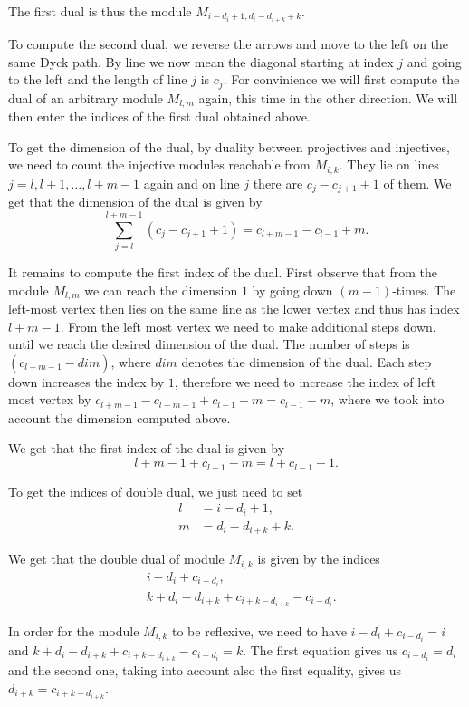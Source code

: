 \documentclass[12pt, a4paper]{article}
\numberwithin{equation}{section}
\theoremstyle{definition}
\theoremstyle{plain}
\theoremstyle{remark}
\begin{document}
The first dual is thus the module $M_{i - d_i + 1, d_i - d_{i+k} + k}$.

To compute the second dual, we reverse the arrows and move to the left on the same Dyck path. By line we now mean the diagonal starting at index $j$ and going to the left and the length of line $j$ is $c_j$.
For convinience we will first compute the dual of an arbitrary module $M_{l,m}$ again, this time in the other direction. We will then enter the indices of the first dual obtained above.

To get the dimension of the dual, by duality between projectives and injectives, we need to count the injective modules reachable from $M_{i,k}$.
They lie on lines $j = l, l+1, \dots, l+m-1$ again and on line $j$ there are $c_j - c_{j+1} + 1$ of them.
We get that the dimension of the dual is given by
\begin{equation}
\label{eq:injectives}      
\sum_{j=l}^{l+m-1} (c_j - c_{j+1} + 1) = c_{l+m-1} - c_{l-1} + m.
\end{equation}

It remains to compute the first index of the dual.
First observe that from the module $M_{l,m}$ we can reach the dimension $1$ by going down $(m - 1)$-times. The left-most vertex then lies on the same line as the lower vertex and thus has index $l + m - 1$.
From the left most vertex we need to make additional steps down, until we reach the desired dimension of the dual.
The number of steps is $(c_{l+m-1} - dim)$, where $dim$ denotes the dimension of the dual.
Each step down increases the index by $1$, therefore we need to increase the index of left most vertex by $c_{l+m-1} - c_{l+m-1} + c_{l-1} - m = c_{l-1} - m$, where we took into account the dimension computed above.

We get that the first index of the dual is given by 
$$l + m - 1 + c_{l-1} - m = l + c_{l-1} - 1.$$

To get the indices of double dual, we just need to set 
\begin{align*}
    l &= i - d_i + 1, \\
    m &= d_i - d_{i+k} + k.
\end{align*}

We get that the double dual of module $M_{i,k}$ is given by the indices
\begin{align*}
    &i - d_i + c_{i - d_i}, \\
    &k + d_i - d_{i+k} + c_{i+k-{d_{i+k}}} - c_{i-d_i}.
\end{align*}

In order for the module $M_{i,k}$ to be reflexive, we need to have $i - d_i + c_{i - d_i} = i$ and $k + d_i - d_{i+k} + c_{i+k-{d_{i+k}}} - c_{i-d_i} = k$.
The first equation gives us $c_{i - d_i} = d_i$ and the second one, taking into account also the first equality, gives us $d_{i+k} = c_{i+k-{d_{i+k}}}$.



 

\end{document}
